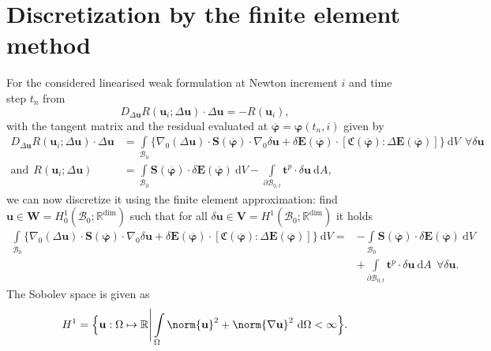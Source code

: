\section{Discretization by the finite element method}
For the considered linearised weak formulation at Newton increment $i$ and time step $t_n$ from 
\begin{equation}
D_{\Delta \mathbf{u}} R(\mathbf{u}_i; \Delta \mathbf{u}) \cdot \Delta\mathbf{u} = -R(\mathbf{u}_{i}) ,
\label{eq:2.24}
\end{equation}
with the tangent matrix and the residual evaluated at $\overline{\bm{\varphi}} = \bm{\varphi}(t_n,i)$ given by
\begin{align*}
D_{\Delta\mathbf{u}} R(\mathbf{u}_i; \Delta \mathbf{u}) \cdot \Delta\mathbf{u} &= \int\limits_{\mathcal{B}_0} \Big\lbrace \nabla_0 (\Delta\mathbf{u}) \cdot \mathbf{S}(\overline{\bm{\varphi}}) \cdot \nabla_0 \delta\mathbf{u} + \delta \mathbf{E}(\overline{\bm{\varphi}}) \cdot \left[ \mathfrak{C}(\overline{\bm{\varphi}}) : \Delta\mathbf{E}(\overline{\bm{\varphi}}) \right] \Big\rbrace \ \mathrm{d}V \ \ \forall \delta\mathbf{u} \\
\text{and} \ \ R(\mathbf{u}_i; \Delta \mathbf{u}) &= \int\limits_{\mathcal{B}_0} \mathbf{S}(\overline{\bm{\varphi}}) \cdot \delta \mathbf{E}(\overline{\bm{\varphi}}) \ \mathrm{d}V - \int\limits_{\mathcal{\partial B}_{0,t}} \mathbf{t}^p \cdot \delta \mathbf{u} \ \mathrm{d}A,
\end{align*}
we can now discretize it using the finite element approximation: find $\mathbf{u} \in \mathbf{W} = H^1_0 (\mathcal{B}_0; \mathbb{R}^{\text{dim}})$ such that for all $\delta\mathbf{u} \in \mathbf{V} = H^1 (\mathcal{B}_0; \mathbb{R}^{\text{dim}})$ it holds
\begin{align}
\int\limits_{\mathcal{B}_0} \Big\lbrace \nabla_0 (\Delta\mathbf{u}) \cdot \mathbf{S}(\overline{\bm{\varphi}}) \cdot \nabla_0 \delta\mathbf{u} + \delta \mathbf{E}(\overline{\bm{\varphi}}) \cdot \left[ \mathfrak{C}(\overline{\bm{\varphi}}) : \Delta\mathbf{E}(\overline{\bm{\varphi}}) \right] \Big\rbrace \ \mathrm{d}V = &-\int\limits_{\mathcal{B}_0} \mathbf{S}(\overline{\bm{\varphi}}) \cdot \delta \mathbf{E}(\overline{\bm{\varphi}}) \ \mathrm{d}V \nonumber \\
&+ \int\limits_{\mathcal{\partial B}_{0,t}} \mathbf{t}^p \cdot \delta \mathbf{u} \ \mathrm{d}A \ \ \forall \delta\mathbf{u}.
\label{eq:2.23}
\end{align}
The Sobolev space is given as 
\begin{equation}
H^1 = \Big\lbrace \mathbf{u}: \Omega \mapsto \mathbb{R} \Bigg| \int\limits_{\Omega} \norm{\mathbf{u}}^2 + \norm{\nabla \mathbf{u}}^2 \ \mathrm{d}\Omega < \infty \Big\rbrace.
\end{equation}
